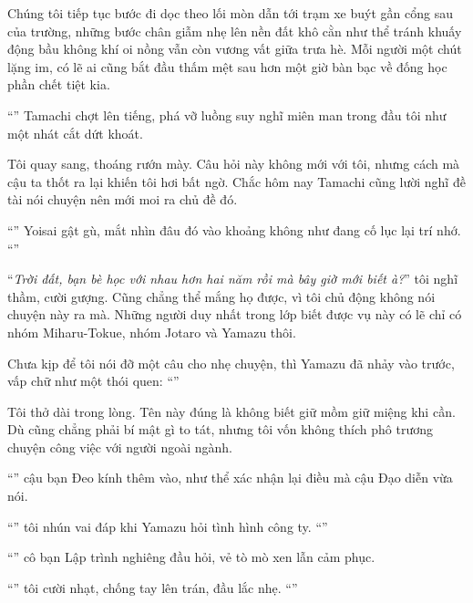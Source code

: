 \documentclass[../main.tex]{subfiles}
\begin{document}
Chúng tôi tiếp tục bước đi dọc theo lối mòn dẫn tới trạm xe buýt gần cổng sau của trường, những bước chân giẫm nhẹ lên nền đất khô cằn như thể tránh khuấy động bầu không khí oi nồng vẫn còn vương vất giữa trưa hè. Mỗi người một chút lặng im, có lẽ ai cũng bắt đầu thấm mệt sau hơn một giờ bàn bạc về đống học phần chết tiệt kia.

``'' Tamachi chợt lên tiếng, phá vỡ luồng suy nghĩ miên man trong đầu tôi như một nhát cắt dứt khoát.

Tôi quay sang, thoáng rướn mày. Câu hỏi này không mới với tôi, nhưng cách mà cậu ta thốt ra lại khiến tôi hơi bất ngờ. Chắc hôm nay Tamachi cũng lười nghĩ đề tài nói chuyện nên mới moi ra chủ đề đó.

``'' Yoisai gật gù, mắt nhìn đâu đó vào khoảng không như đang cố lục lại trí nhớ. ``''

``\textit{Trời đất, bạn bè học với nhau hơn hai năm rồi mà bây giờ mới biết à?}'' tôi nghĩ thầm, cười gượng. Cũng chẳng thể mắng họ được, vì tôi chủ động không nói chuyện này ra mà. Những người duy nhất trong lớp biết được vụ này có lẽ chỉ có nhóm Miharu-Tokue, nhóm Jotaro và Yamazu thôi.

Chưa kịp để tôi nói đỡ một câu cho nhẹ chuyện, thì Yamazu đã nhảy vào trước, vấp chữ như một thói quen: ``''

Tôi thở dài trong lòng. Tên này đúng là không biết giữ mồm giữ miệng khi cần. Dù cũng chẳng phải bí mật gì to tát, nhưng tôi vốn không thích phô trương chuyện công việc với người ngoài ngành.

``'' cậu bạn Đeo kính thêm vào, như thể xác nhận lại điều mà cậu Đạo diễn vừa nói.

``'' tôi nhún vai đáp khi Yamazu hỏi tình hình công ty. ``''

``'' cô bạn Lập trình nghiêng đầu hỏi, vẻ tò mò xen lẫn cảm phục.

``'' tôi cười nhạt, chống tay lên trán, đầu lắc nhẹ. ``''
\end{document}
